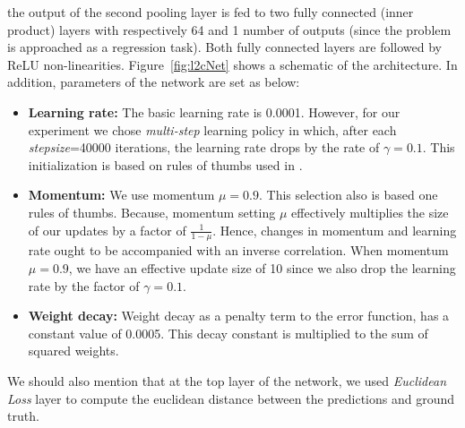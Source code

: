\noindent the output of the second pooling layer is fed to two fully connected (inner product) layers with respectively 64 and 1 number of outputs (since the problem is approached as a regression task). Both fully connected layers are followed by ReLU non-linearities. Figure~\ref{fig:l2cNet} shows a schematic of the architecture. In addition, parameters of the network are set as below:
\begin{itemize}
\item \textbf{Learning rate:} The basic learning rate is 0.0001. However, for our experiment we chose \textit{multi-step} learning policy in which, after each \textit{stepsize}=40000 iterations, the learning rate drops by the rate of $\gamma = 0.1$. This initialization is based on rules of thumbs used in \cite{krizhevsky2012imagenet}.
\item \textbf{Momentum:} We use momentum $\mu = 0.9$. This selection also is based one rules of thumbs. Because, momentum setting $\mu$ effectively multiplies the size of our updates by a factor of $\frac{1}{1-\mu}$. Hence, changes in momentum and learning rate ought to be accompanied with an inverse correlation. When momentum $\mu = 0.9$, we have an effective update size of 10 since we also drop the learning rate by the factor of $\gamma= 0.1$.
\item \textbf{Weight decay:} Weight decay as a penalty term to the error function, has a constant value of 0.0005. This decay constant is multiplied to the sum of squared weights.
\end{itemize}

\noindent We should also mention that at the top layer of the network, we used \textit{Euclidean Loss }layer to compute  the euclidean distance between the predictions and ground truth. 

